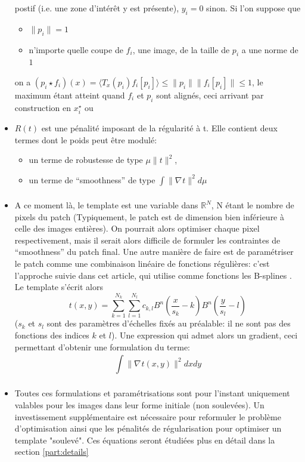 \documentclass{article}
\begin{document}
\begin{itemize}
        postif (i.e. une zone d'intérêt y est présente), $y_i=0$ sinon. Si l'on suppose que 
        \begin{itemize}
            \item $ \|p_i\| = 1 $
            \item n'importe quelle coupe de $ f_i $, une image, de la taille de $ p_i $ a une norme
                de $ 1 $
        \end{itemize}
        on a $ (p_i \star f_i)(x) = \mathcal  \langle T_x(p_i) f_i[p_i] \rangle  \leq
        \|p_i\| \|f_i[p_i]\| \leq  1$, le maximum étant atteint quand $ f_i $ et $ p_i $ 
        sont alignés, ceci arrivant par construction en $ {x}^{\star}_i $
        ou 
    \item $ R(t) $ est une pénalité imposant de la régularité à t. Elle contient deux
      termes dont le poids peut être modulé:
      \begin{itemize}
        \item un terme de robustesse de type $ \mu\|t\|^2 $,
        \item un terme de ``smoothness'' de type $ \int\limits_{  }^{  } \| \nabla_{
          } t \|^2 d \mu $
      \end{itemize}
    \item A ce moment là, le template est une variable dans $ \mathbb{R}^N$, N étant le
      nombre de pixels du patch (Typiquement, le patch est de dimension bien
        inférieure à celle des images entières). On pourrait alors optimiser chaque pixel
        respectivement, mais il serait alors difficile de formuler les contraintes de
        ``smoothness'' du patch final. Une autre manière de faire est de paramétriser le
        patch comme une combinaison linéaire de fonctions régulières: c'est l'approche
        suivie dans cet article, qui utilise comme fonctions les B-splines \cite{bspline}. Le template
        s'écrit alors
        \[
            t(x, y) = \sum\limits_{ k=1 }^{ N_k } \sum\limits_{ l=1 }^{ N_l } c_{k, l} B^n \left (
            \frac{x}{s_k} - k \right ) B^n \left ( \frac{y}{s_{l}} - l \right )
            \label{eq:spline} \tag{1}
        \] %
        ($ s_k $ et $ s_l $ sont des paramètres d'échelles fixés au préalable: il
        ne sont pas des fonctions des indices $ k $ et $ l $).
        Une expression qui admet alors un gradient, ceci permettant d'obtenir une
        formulation du terme: 
        \[
            \int\limits_{  }^{  } \| \nabla_{  } t(x, y) \|^2 dx dy
        \] 
    \item \vspace*{-1.5em} Toutes ces formulations et paramétrisations sont pour l'instant uniquement
      valables pour les images dans leur forme initiale (non soulevées). Un
      investissement supplémentaire est nécessaire pour reformuler le problème
      d'optimisation ainsi que les pénalités de régularisation pour optimiser un
      template "soulevé". Ces équations seront étudiées plus en détail dans la section
      \ref{part:details}
\end{itemize}
\end{document}
